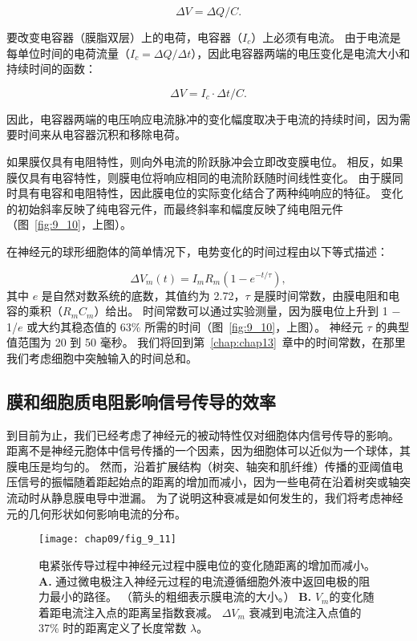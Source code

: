 \begin{equation}
	\Delta V = \Delta Q/C.
\end{equation}


要改变电容器（膜脂双层）上的电荷，电容器（$I_c$）上必须有电流。
由于电流是每单位时间的电荷流量（$I_c = \Delta Q/ \Delta t $），因此电容器两端的电压变化是电流大小和持续时间的函数：

\begin{equation}
	\Delta V = I_c \cdot \Delta t / C.
\end{equation}


因此，电容器两端的电压响应电流脉冲的变化幅度取决于电流的持续时间，因为需要时间来从电容器沉积和移除电荷。


如果膜仅具有电阻特性，则向外电流的阶跃脉冲会立即改变膜电位。
相反，如果膜仅具有电容特性，则膜电位将响应相同的电流阶跃随时间线性变化。
由于膜同时具有电容和电阻特性，因此膜电位的实际变化结合了两种纯响应的特征。
变化的初始斜率反映了纯电容元件，而最终斜率和幅度反映了纯电阻元件（图~\ref{fig:9_10}，上图）。


在神经元的球形细胞体的简单情况下，电势变化的时间过程由以下等式描述：

\begin{equation}
	\Delta V_m (t) = I_m R_m (1 - e^{-t/\tau}),
\end{equation}
其中 $e$ 是自然对数系统的底数，其值约为 2.72，$\tau$ 是膜时间常数，由膜电阻和电容的乘积（$R_m C_m$）给出。
时间常数可以通过实验测量，因为膜电位上升到 1 − 1/$e$ 或大约其稳态值的 63\% 所需的时间（图~\ref{fig:9_10}，上图）。 
神经元 $\tau$ 的典型值范围为 20 到 50 毫秒。
我们将回到第~\ref{chap:chap13}~章中的时间常数，在那里我们考虑细胞中突触输入的时间总和。



\subsection{膜和细胞质电阻影响信号传导的效率}

到目前为止，我们已经考虑了神经元的被动特性仅对细胞体内信号传导的影响。
距离不是神经元胞体中信号传播的一个因素，因为细胞体可以近似为一个球体，其膜电压是均匀的。
然而，沿着扩展结构（树突、轴突和肌纤维）传播的亚阈值电压信号的振幅随着距起始点的距离的增加而减小，因为一些电荷在沿着树突或轴突流动时从静息膜电导中泄漏。
为了说明这种衰减是如何发生的，我们将考虑神经元的几何形状如何影响电流的分布。


\begin{figure}[htbp]
	\centering
	\texttt{[image: chap09/fig\_9\_11]}
	\caption{电紧张传导过程中神经元过程中膜电位的变化随距离的增加而减小。
		\textbf{A.} 通过微电极注入神经元过程的电流遵循细胞外液中返回电极的阻力最小的路径。
		（箭头的粗细表示膜电流的大小。）
		\textbf{B.} $V_m$的变化随着距电流注入点的距离呈指数衰减。
		$\Delta V_m$ 衰减到电流注入点值的 37\% 时的距离定义了长度常数 $\lambda$。}
	\label{fig:9_11}
\end{figure}

